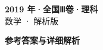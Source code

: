 \documentclass[zihao=-4, a4paper]{ctexart}
\begin{document}
\begin{center}
  {\Large\bfseries 2019 年·全国Ⅲ卷·理科}\\[4pt]
  {\large 数学 · 解析版}
\end{center}
\medskip
{}

\clearpage
{}
\begin{center}{\Large\bfseries 参考答案与详细解析}\end{center}
\medskip

\end{document}
